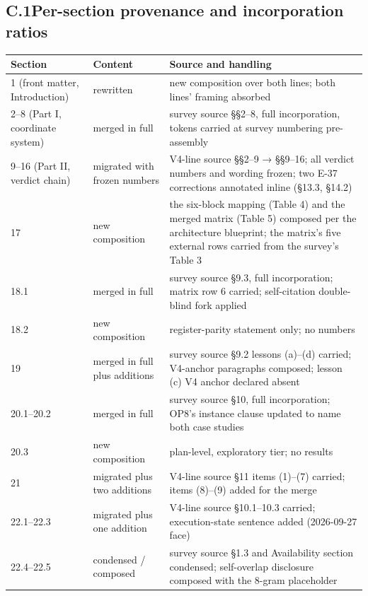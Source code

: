 \documentclass[11pt]{article}
\begin{document}
\subsection*{C.1\quad Per-section provenance and incorporation ratios}
\begingroup
\footnotesize\setlength{\LTcapwidth}{\textwidth}
\begin{longtable}{@{}l p{} >{\raggedright\arraybackslash}p{}@{}}
\toprule
\textbf{Section} & \textbf{Content} & \textbf{Source and handling} \\
\midrule
1 (front matter, Introduction) & rewritten & new composition over both lines; both lines' framing absorbed \\
2–8 (Part I, coordinate system) & merged in full & survey source §§2–8, full incorporation, tokens carried at survey numbering pre-assembly \\
9–16 (Part II, verdict chain) & migrated with frozen numbers & V4-line source §§2–9 → §§9–16; all verdict numbers and wording frozen; two E-37 corrections annotated inline (§13.3, §14.2) \\
17 & new composition & the six-block mapping (Table 4) and the merged matrix (Table 5) composed per the architecture blueprint; the matrix's five external rows carried from the survey's Table 3 \\
18.1 & merged in full & survey source §9.3, full incorporation; matrix row 6 carried; self-citation double-blind fork applied \\
18.2 & new composition & register-parity statement only; no numbers \\
19 & merged in full plus additions & survey source §9.2 lessons (a)–(d) carried; V4-anchor paragraphs composed; lesson (c) V4 anchor declared absent \\
20.1–20.2 & merged in full & survey source §10, full incorporation; OP8's instance clause updated to name both case studies \\
20.3 & new composition & plan-level, exploratory tier; no results \\
21 & migrated plus two additions & V4-line source §11 items (1)–(7) carried; items (8)–(9) added for the merge \\
22.1–22.3 & migrated plus one addition & V4-line source §10.1–10.3 carried; execution-state sentence added (2026-09-27 face) \\
22.4–22.5 & condensed / composed & survey source §1.3 and Availability section condensed; self-overlap disclosure composed with the 8-gram placeholder \\

\end{longtable}
\end{document}
